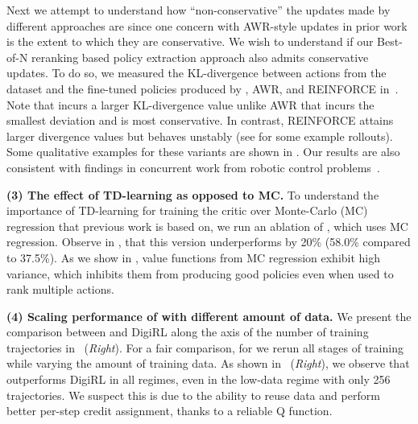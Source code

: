 Next we attempt to understand how ``non-conservative'' the updates made by different approaches are since one concern with AWR-style updates in prior work is the extent to which they are conservative. We wish to understand if our Best-of-N reranking based policy extraction approach also admits conservative updates. To do so, we measured the KL-divergence between actions from the dataset and the fine-tuned policies produced by \ourmethod{}, AWR, and REINFORCE in~. Note that \ourmethod{} incurs a larger KL-divergence value unlike AWR that incurs the smallest deviation and is most conservative. In contrast, REINFORCE attains larger divergence values but behaves unstably (see  for some example rollouts). Some qualitative examples for these variants are shown in . Our results are also consistent with findings in concurrent work from robotic control problems~\citep{sobolmark2024policy}.

\textbf{(3) The effect of TD-learning as opposed to MC.} To understand the importance of TD-learning for training the critic over Monte-Carlo (MC) regression that previous work is based on, we run an ablation of \ourmethod{}, which uses MC regression. Observe in , that this version underperforms \ourmethod{} by 20\% (58.0\% compared to 37.5\%). As we show in , value functions from MC regression exhibit high variance, which inhibits them from producing good policies even when used to rank multiple actions.


\textbf{(4) Scaling performance of \ourmethod{} with different amount of data.} We present the comparison between \ourmethod{} and DigiRL along the axis of the number of training trajectories in~ (\textit{Right}). For a fair comparison, for \ourmethod{} we rerun all stages of training while varying the amount of training data. As shown in~ (\textit{Right}), we observe that \ourmethod{} outperforms DigiRL in all regimes, even in the low-data regime with only 256 trajectories. We suspect this is due to the ability to reuse data and perform better per-step credit assignment, thanks to a reliable Q function.


